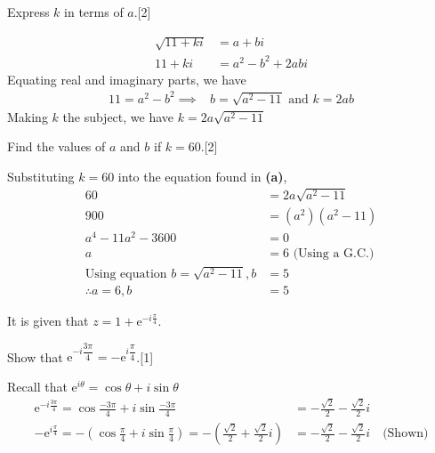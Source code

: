 \documentclass[12pt, a4 paper]{article}
\begin{document}
\begin{outline}[enumerate]
	\2 Express $k$ in terms of $a$.\hfill[2]
	\begin{answer}
		\begin{align*}
			\sqrt{11+ki} & =a+bi              \\
			11+ki        & = a^2 - b^2 + 2abi
		\end{align*}
		Equating real and imaginary parts, we have
		\begin{align*}
			11=a^2 -b^2 \implies & b=\sqrt{a^2-11}\textrm{  and  }k=2ab
		\end{align*}
		Making $k$ the subject, we have $k=2a\sqrt{a^2-11}$
	\end{answer}
	\2 Find the values of $a$ and $b$ if $k=60$.\hfill[2]
	\begin{answer}
		Substituting $k=60$ into the equation found in \textbf{(a)},
		\begin{align*}
			60                                         & = 2a\sqrt{a^2-11}           \\
			900                                        & = (a^2)(a^2-11)             \\
			a^4-11a^2-3600                             & = 0                         \\
			a                                          & = 6\textrm{ (Using a G.C.)} \\
			\textrm{Using equation }b=\sqrt{a^2-11}, b & =5                          \\
			\therefore a=6,b                           & =5
		\end{align*}
	\end{answer}
	\1 It is given that $z=1+\mathrm{e}^{-i\frac{\pi}{4}}$. %

	\2 Show that $\mathrm{e}^{-i\dfrac{3\pi}{4}}=-\mathrm{e}^{i\dfrac{\pi}{4}}$.\hfill[1]
	\begin{answer}
		Recall that $\mathrm{e}^{i\theta} = \cos\theta + i\sin\theta$
		\begin{align*}
			\mathrm{e}^{-i\frac{3\pi}{4}} = \cos\frac{-3\pi}{4} + i\sin\frac{-3\pi}{4}                                           & = -\frac{\sqrt{2}}{2}-\frac{\sqrt{2}}{2}i                       \\
			-\mathrm{e}^{i\frac{\pi}{4}} = -(\cos\frac{\pi}{4} + i\sin\frac{\pi}{4}) = -(\frac{\sqrt{2}}{2}+\frac{\sqrt{2}}{2}i) & = -\frac{\sqrt{2}}{2}-\frac{\sqrt{2}}{2}i \quad\textrm{(Shown)}
		\end{align*}
	\end{answer}


\end{outline}
\end{document}
